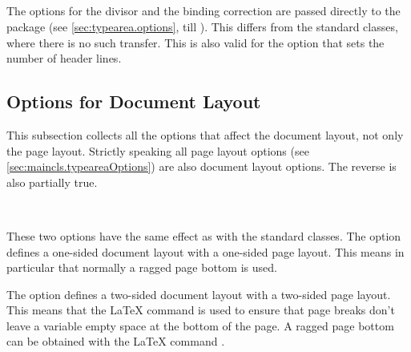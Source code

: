 \begin{Declaration}
  \\
  \\
  \\
  \\
\end{Declaration}%
%
%
%
%
%
The options for the divisor and the binding correction are passed directly to the  package
(see \autoref{sec:typearea.options}, 
till ). This differs from the
standard classes, where there is no such transfer. This is also valid
for the option that sets the number of header lines.
%
%
%
%
%


\subsection{Options for Document Layout}
\label{sec:maincls.layoutOptions}

This subsection collects all the options that affect the document
layout, not only the page layout. Strictly speaking all page layout
options (see \autoref{sec:maincls.typeareaOptions}) are also
document layout options. The reverse is also partially true.

\begin{Declaration}
  \\
\end{Declaration}%
%
These two options have the same effect as with the standard classes.
The option  defines a one-sided document layout with a
one-sided page layout. This means in particular that normally a ragged
page bottom is used.

The option  defines a two-sided document layout with a
two-sided page layout. This means that the \LaTeX{} command
 is used to ensure that page
breaks don't leave a variable empty space at the bottom of the page. A
ragged page bottom can be obtained with the \LaTeX{} command
.
%
%
%


